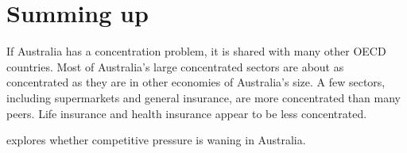 \section{Summing up}

If Australia has a concentration problem, it is shared with many other OECD countries. Most of Australia's large concentrated sectors are about as concentrated as they are in other economies of Australia's size. A few sectors, including supermarkets and general insurance, are more concentrated than many peers. Life insurance and health insurance appear to be less concentrated.

 explores whether competitive pressure is waning in Australia.

